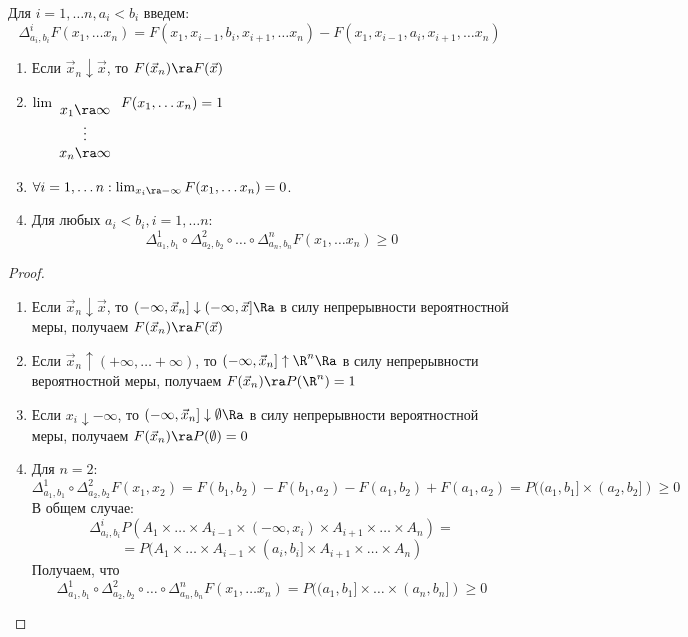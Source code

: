 \begin{definition}
    Для \(i = 1, \dots n, a_i < b_i\) введем:
    \[\Delta_{a_i, b_i}^iF(x_1, \dots x_n) = F(x_1, x_{i - 1}, b_i, x_{i + 1}, \dots x_n) - F(x_1, x_{i - 1}, a_i, x_{i + 1}, \dots x_n)\]
\end{definition}

\begin{lemma}
    \begin{enumerate}
        \item Если \(\vec{x}_n \downarrow \vec{x}\), то \(F(\vec{x}_n) \ra F(\vec{x})\)
        \item \(\lim_{\begin{array}{c}
            x_1 \ra \infty \\
            \vdots \\
            x_n \ra \infty
        \end{array}} F(x_1, \dots x_n) = 1\)
        \item \(\forall i = 1, \dots n: \lim_{x_i \ra -\infty} F(x_1, \dots x_n) = 0\).
        \item Для любых \(a_i < b_i, i = 1, \dots n\):
        \[\Delta_{a_1, b_1}^1 \circ \Delta_{a_2, b_2}^2 \circ \dots \circ \Delta_{a_n, b_n}^n F(x_1, \dots x_n) \ge 0\]
    \end{enumerate}
\end{lemma}
\begin{proof}\indent
    \begin{enumerate}
        \item Если \(\vec{x}_n \downarrow \vec{x}\), то \((-\infty, \vec{x}_n] \downarrow (-\infty, \vec{x}] \Ra\) в силу непрерывности вероятностной меры, получаем \(F(\vec{x}_n) \ra F(\vec{x})\)
        \item Если \(\vec{x}_n \uparrow (+\infty, \dots +\infty)\), то \((-\infty, \vec{x}_n] \uparrow \R^n \Ra\) в силу непрерывности вероятностной меры, получаем \(F(\vec{x}_n) \ra P(\R^n) = 1\)
        \item Если \(x_i \downarrow -\infty\), то \((-\infty, \vec{x}_n] \downarrow \emptyset \Ra\) в силу непрерывности вероятностной меры, получаем \(F(\vec{x}_n) \ra P(\emptyset) = 0\)
        \item Для \(n = 2\):
        \[\Delta^1_{a_1, b_1} \circ \Delta^2_{a_2, b_2} F(x_1, x_2) = F(b_1, b_2) - F(b_1, a_2) - F(a_1, b_2) + F(a_1, a_2) = P((a_1, b_1] \times (a_2, b_2]) \ge 0\]
        В общем случае:
        \[\Delta_{a_i, b_i}^i P(A_1 \times \dots \times A_{i - 1} \times (-\infty, x_i) \times A_{i + 1} \times \dots \times A_n) = \]
        \[= P(A_1 \times \dots \times A_{i - 1} \times (a_i, b_i] \times A_{i + 1} \times \dots \times A_n)\]
        Получаем, что 
        \[\Delta_{a_1, b_1}^1 \circ \Delta_{a_2, b_2}^2 \circ \dots \circ \Delta_{a_n, b_n}^n F(x_1, \dots x_n) = P((a_1, b_1] \times \dots \times (a_n, b_n]) \ge 0\]
    \end{enumerate}
\end{proof}

